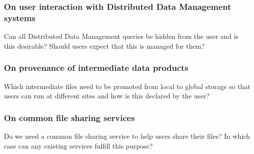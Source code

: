 \subsubsection*{On user interaction with Distributed Data Management systems}
Can all Distributed Data Management queries be hidden from the user and is this desirable? Should users expect that this is managed for them? 

\subsubsection*{On provenance of intermediate data products}
Which intermediate files need to be promoted from local to global storage so that users can run at different sites and how is this declared by the user? 

\subsubsection*{On common file sharing services}
Do we need a common file sharing service to help users share their files? In which case can any existing services fulfill this purpose? 


